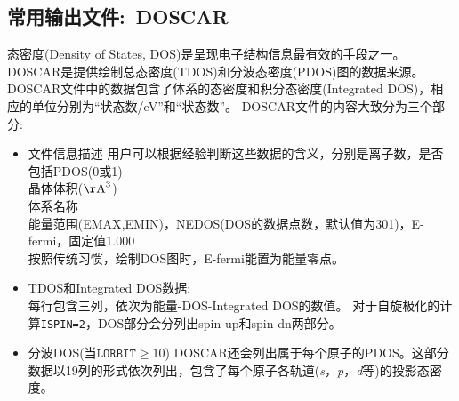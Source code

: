 \subsection{常用输出文件:~\rm{DOSCAR}}\label{subsectr:DOSCAR}
%
%
态密度\textrm{(Density of States, DOS)}是呈现电子结构信息最有效的手段之一。\textrm{DOSCAR}是提供绘制总态密度\textrm{(TDOS)}和分波态密度\textrm{(PDOS)}图的数据来源。\textrm{DOSCAR}文件中的数据包含了体系的态密度和积分态密度\textrm{(Integrated DOS)}，相应的单位分别为``状态数\textrm{/eV}''和``状态数''。
%
%
%
\textrm{DOSCAR}文件的内容大致分为三个部分:
\begin{itemize}
	\item 文件信息描述 
{\fontsize{8.2pt}{6.2pt}\selectfont{
}}
用户可以根据经验判断这些数据的含义，分别是离子数，是否包括\textrm{PDOS}(0或1)\\
晶体体积($\mathrm{\AA}^3$)\\
体系名称\\
能量范围(\textrm{EMAX},\textrm{EMIN})，\textrm{NEDOS}(\textrm{DOS}的数据点数，默认值为301)，\textrm{E-fermi}，固定值1.000\\
按照传统习惯，绘制\textrm{DOS}图时，\textrm{E-fermi}能置为能量零点。
%
%
\item \textrm{TDOS}和\textrm{Integrated DOS}数据:\\
	每行包含三列，依次为能量-\textrm{DOS}-\textrm{Integrated DOS}的数值。
%
	对于自旋极化的计算\texttt{ISPIN=2}，\textrm{DOS}部分会分列出\textrm{spin-up}和\textrm{spin-dn}两部分。
%
\item 分波DOS(当$\mathtt{LORBIT}\geqslant10$)
	\textrm{DOSCAR}还会列出属于每个原子的\textrm{PDOS}。这部分数据以19列的形式依次列出，包含了每个原子各轨道(\textit{s}，\textit{p}，\textit{d}等)的投影态密度。
%
\end{itemize}
%
